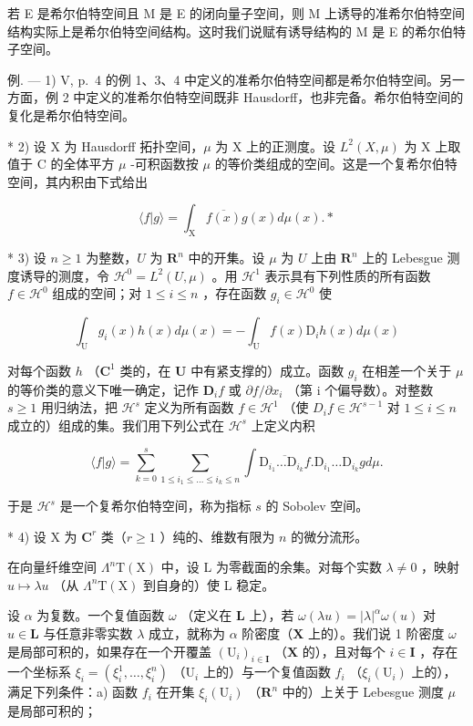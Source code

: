 若 E 是希尔伯特空间且 M 是 E 的闭向量子空间，则 M 上诱导的准希尔伯特空间结构实际上是希尔伯特空间结构。这时我们说赋有诱导结构的 M 是 E 的希尔伯特子空间。

例. --- 1) V, p.~4 的例 1、3、4 中定义的准希尔伯特空间都是希尔伯特空间。另一方面，例 2 中定义的准希尔伯特空间既非 Hausdorff，也非完备。希尔伯特空间的复化是希尔伯特空间。

* 2) 设 X 为 Hausdorff 拓扑空间，\(\mu\) 为 X 上的正测度。设 \(L^2(X, \mu)\) 为 X 上取值于 C 的全体平方 \(\mu\) -可积函数按 \(\mu\) 的等价类组成的空间。这是一个复希尔伯特空间，其内积由下式给出

\[
\langle f | g \rangle = \int_ {\mathrm{X}} \overline {{{f (x)}}} g (x) d \mu (x). *
\]

* 3) 设 \(n \geqslant 1\) 为整数，\(U\) 为 \(\mathbf{R}^n\) 中的开集。设 \(\mu\) 为 \(U\) 上由 \(\mathbf{R}^n\) 上的 Lebesgue 测度诱导的测度，令 \(\mathcal{H}^0 = L^2(U, \mu)\) 。用 \(\mathcal{H}^1\) 表示具有下列性质的所有函数 \(f \in \mathcal{H}^0\) 组成的空间；对 \(1 \leqslant i \leqslant n\) ，存在函数 \(g_i \in \mathcal{H}^0\) 使

\[
\int_ {\mathrm{U}} g _ {i} (x) h (x) d \mu (x) = - \int_ {\mathrm{U}} f (x) \mathrm{D} _ {i} h (x) d \mu (x)
\]

对每个函数 \(h\) （\(\mathbf{C}^1\) 类的，在 \(\mathbf{U}\) 中有紧支撑的）成立。函数 \(g_i\) 在相差一个关于 \(\mu\) 的等价类的意义下唯一确定，记作 \(\mathbf{D}_i f\) 或 \(\partial f / \partial x_i\) （第 i 个偏导数）。对整数 \(s \geqslant 1\) 用归纳法，把 \(\mathcal{H}^s\) 定义为所有函数 \(f \in \mathcal{H}^1\) （使 \(D_i f \in \mathcal{H}^{s-1}\) 对 \(1 \leqslant i \leqslant n\) 成立的）组成的集。我们用下列公式在 \(\mathcal{H}^s\) 上定义内积

\[
\langle f | g \rangle = \sum_ {k = 0} ^ {s} \sum_ {1 \leqslant i _ {1} \leqslant \dots \leqslant i _ {k} \leqslant n} \int \overline {{{{\mathrm{D} _ {i _ {1}} \dots \mathrm{D} _ {i _ {k}} f}}}}. \mathrm{D} _ {i _ {1}} \dots \mathrm{D} _ {i _ {k}} g d \mu .
\]

于是 \(\mathcal{H}^s\) 是一个复希尔伯特空间，称为指标 \(s\) 的 Sobolev 空间。

* 4) 设 X 为 \(\mathbf{C}^r\) 类（\(r \geqslant 1\) ）纯的、维数有限为 \(n\) 的微分流形。

在向量纤维空间 \(\Lambda^{n}\mathrm{T}(\mathrm{X})\) 中，设 L 为零截面的余集。对每个实数 \(\lambda \neq 0\) ，映射 \(u \mapsto \lambda u\) （从 \(\Lambda^{n}\mathrm{T}(\mathrm{X})\) 到自身的）使 L 稳定。

设 \(\alpha\) 为复数。一个复值函数 \(\omega\) （定义在 \(\mathbf{L}\) 上），若 \(\omega (\lambda u) = |\lambda |^{\alpha}\omega (u)\) 对 \(u\in \mathbf{L}\) 与任意非零实数 \(\lambda\) 成立，就称为 \(\alpha\) 阶密度（\(\mathbf{X}\) 上的）。我们说 1 阶密度 \(\omega\) 是局部可积的，如果存在一个开覆盖 \((\mathrm{U}_i)_{i\in \mathbf{I}}\) （\(\mathbf{X}\) 的），且对每个 \(i\in \mathbf{I}\) ，存在一个坐标系 \(\xi_i = (\xi_i^1,\dots,\xi_i^n)\) （\(\mathrm{U}_i\) 上的）与一个复值函数 \(f_{i}\) （\(\xi_i(\mathrm{U}_i)\) 上的），满足下列条件：a) 函数 \(f_{i}\) 在开集 \(\xi_i(\mathrm{U}_i)\) （\(\mathbf{R}^n\) 中的）上关于 Lebesgue 测度 \(\mu\) 是局部可积的；

